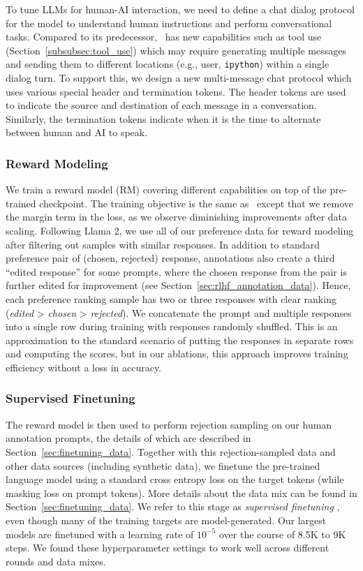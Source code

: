\documentclass[dvipsnames]{fairmeta}
\begin{document}
To tune LLMs for human-AI interaction, we need to define a chat dialog protocol for the model to understand human instructions and perform conversational tasks. Compared to its predecessor, \llamathree~has new capabilities such as tool use (Section~\ref{subsubsec:tool_use}) which may require generating multiple messages and sending them to different locations (e.g., user, \texttt{ipython}) within a single dialog turn. To support this, we design a new multi-message chat protocol which uses various special header and termination tokens. The header tokens are used to indicate the source and destination of each message in a conversation. Similarly, the termination tokens indicate when it is the time to alternate between human and AI to speak. 

\subsubsection{Reward Modeling}
\label{subsubsec:rm}

We train a reward model (RM) covering different capabilities on top of the pre-trained checkpoint. The training objective is the same as \llamatwo~except that we remove the margin term in the loss, as we observe diminishing improvements after data scaling. Following Llama 2, we use all of our preference data for reward modeling after filtering out samples with similar responses. In addition to standard preference pair of (chosen, rejected) response, annotations also create a third ``edited response'' for some prompts, where the chosen response from the pair is further edited for improvement (see Section~\ref{sec:rlhf_annotation_data}). Hence, each preference ranking sample has two or three responses with clear ranking (\emph{edited} > \emph{chosen} > \emph{rejected}). We concatenate the prompt and multiple responses into a single row during training with responses randomly shuffled. This is an approximation to the standard scenario of putting the responses in separate rows and computing the scores, but in our ablations, this approach improves training efficiency without a loss in accuracy. 

\subsubsection{Supervised Finetuning}
\label{subsubsec:sft}
The reward model is then used to perform rejection sampling on our human annotation prompts, the details of which are described in Section~\ref{sec:finetuning_data}. Together with this rejection-sampled data and other data sources (including synthetic data), we finetune the pre-trained language model using a standard cross entropy loss on the target tokens (while masking loss on prompt tokens).
More details about the data mix can be found in Section~\ref{sec:finetuning_data}.
We refer to this stage as \emph{supervised finetuning} \citep[SFT;][]{weifinetuned,sanh2022multitask,wang2022super}, even though many of the training targets are model-generated.
Our largest models are finetuned with a learning rate of $10^{-5}$ over the course of 8.5K to 9K steps. We found these hyperparameter settings to work well across different rounds and data mixes.
\end{document}
